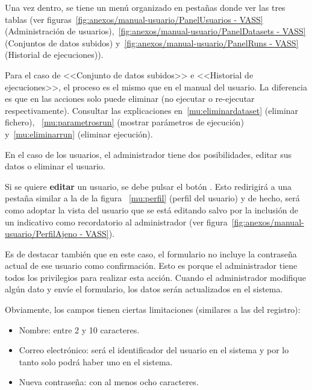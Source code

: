 
Una vez dentro, se tiene un menú organizado en pestañas donde ver las tres
tablas (ver figuras~\ref{fig:anexos/manual-usuario/PanelUsuarios - VASS}
(Administración de usuarios),~\ref{fig:anexos/manual-usuario/PanelDatasets -
VASS} (Conjuntos de datos subidos) y~\ref{fig:anexos/manual-usuario/PanelRuns -
VASS} (Historial de ejecuciones)).




Para el caso de <<Conjunto de datos subidos>> e <<Historial de ejecuciones>>, el
proceso es el mismo que en el manual del usuario. La diferencia es que en las
acciones solo puede eliminar (no ejecutar o re-ejecutar respectivamente).
Consultar las explicaciones  en~\ref{mu:eliminardataset} (eliminar fichero),
~\ref{mu:parametrosrun} (mostrar parámetros de ejecución) y~\ref{mu:eliminarrun}
(eliminar ejecución).

En el caso de los usuarios, el administrador tiene dos posibilidades, editar sus
datos o eliminar el usuario.

Si se quiere \textbf{editar} un usuario, se debe pulsar el botón
\button[vassgreen]{\faPencil}. Esto redirigirá a una pestaña similar a la de la
figura ~\ref{mu:perfil} (perfil del usuario) y de hecho, será como adoptar la
vista del usuario que se está editando salvo por la inclusión de un indicativo
como recordatorio al administrador (ver
figura~\ref{fig:anexos/manual-usuario/PerfilAjeno - VASS}).


Es de destacar también que en este caso, el formulario no incluye la contraseña
actual de ese usuario como confirmación. Esto es porque el administrador tiene
todos los privilegios para realizar esta acción. Cuando el administrador
modifique algún dato y envíe el formulario, los datos serán actualizados en el
sistema. 

Obviamente, los campos tienen ciertas limitaciones (similares a las del
registro):
\begin{itemize}
    \item Nombre: entre 2 y 10 caracteres.
    \item Correo electrónico: será el identificador del usuario en el sistema y
    por lo tanto solo podrá haber uno en el sistema.
    \item Nueva contraseña: con al menos ocho caracteres.
\end{itemize}

